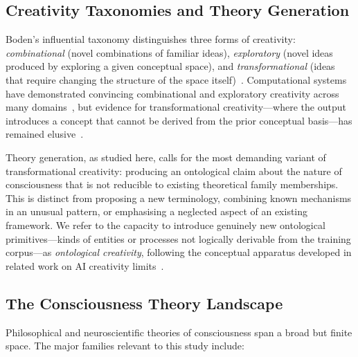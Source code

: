 \documentclass[pdflatex,sn-mathphys-num]{sn-jnl}
\begin{document}
\subsection{Creativity Taxonomies and Theory Generation}

Boden's influential taxonomy distinguishes three forms of creativity:
\emph{combinational} (novel combinations of familiar ideas),
\emph{exploratory} (novel ideas produced by exploring a given conceptual
space), and \emph{transformational} (ideas that require changing the structure
of the space itself)~\cite{boden2004creative}.  Computational systems have
demonstrated convincing combinational and exploratory creativity across many
domains~\cite{cope1996experiments,hofstadter1995fluid,colton2012computational,gu2025combinatorial},
but evidence for transformational creativity---where the output introduces a
concept that cannot be derived from the prior conceptual basis---has remained
elusive~\cite{wiggins2006preliminary,shahhosseini2026survey}.

Theory generation, as studied here, calls for the most demanding variant of
transformational creativity: producing an ontological claim about the nature of
consciousness that is not reducible to existing theoretical family
memberships.  This is distinct from proposing a new terminology, combining known
mechanisms in an unusual pattern, or emphasising a neglected aspect of an
existing framework.  We refer to the capacity to introduce genuinely new
ontological primitives---kinds of entities or processes not logically derivable
from the training corpus---as \emph{ontological creativity}, following the
conceptual apparatus developed in related work on AI creativity
limits~\cite{boden2004creative}.

\subsection{The Consciousness Theory Landscape}

Philosophical and neuroscientific theories of consciousness span a broad but
finite space.  The major families relevant to this study include:
\end{document}
